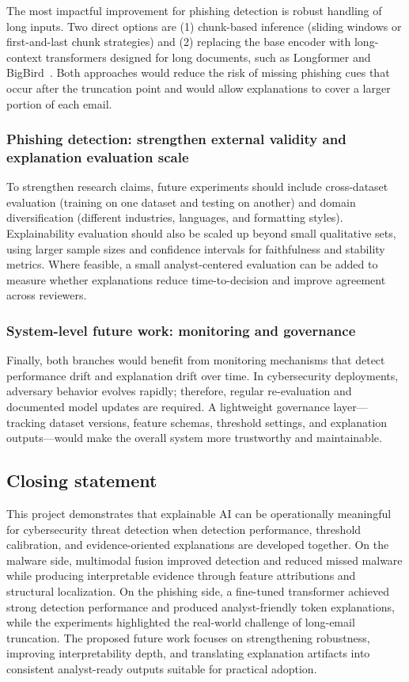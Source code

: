 \documentclass[conference]{IEEEtran}
\begin{document}
The most impactful improvement for phishing detection is robust handling of long inputs. Two direct options are (1) chunk-based inference (sliding windows or first-and-last chunk strategies) and (2) replacing the base encoder with long-context transformers designed for long documents, such as Longformer and BigBird~\cite{HP20182018}\cite{RBSBCN2017}. Both approaches would reduce the risk of missing phishing cues that occur after the truncation point and would allow explanations to cover a larger portion of each email.

\subsubsection{Phishing detection: strengthen external validity and explanation evaluation scale}

To strengthen research claims, future experiments should include cross-dataset evaluation (training on one dataset and testing on another) and domain diversification (different industries, languages, and formatting styles). Explainability evaluation should also be scaled up beyond small qualitative sets, using larger sample sizes and confidence intervals for faithfulness and stability metrics. Where feasible, a small analyst-centered evaluation can be added to measure whether explanations reduce time-to-decision and improve agreement across reviewers.

\subsubsection{System-level future work: monitoring and governance}

Finally, both branches would benefit from monitoring mechanisms that detect performance drift and explanation drift over time. In cybersecurity deployments, adversary behavior evolves rapidly; therefore, regular re-evaluation and documented model updates are required. A lightweight governance layer---tracking dataset versions, feature schemas, threshold settings, and explanation outputs---would make the overall system more trustworthy and maintainable.

\subsection{Closing statement}

This project demonstrates that explainable AI can be operationally meaningful for cybersecurity threat detection when detection performance, threshold calibration, and evidence-oriented explanations are developed together. On the malware side, multimodal fusion improved detection and reduced missed malware while producing interpretable evidence through feature attributions and structural localization. On the phishing side, a fine-tuned transformer achieved strong detection performance and produced analyst-friendly token explanations, while the experiments highlighted the real-world challenge of long-email truncation. The proposed future work focuses on strengthening robustness, improving interpretability depth, and translating explanation artifacts into consistent analyst-ready outputs suitable for practical adoption.
\end{document}
